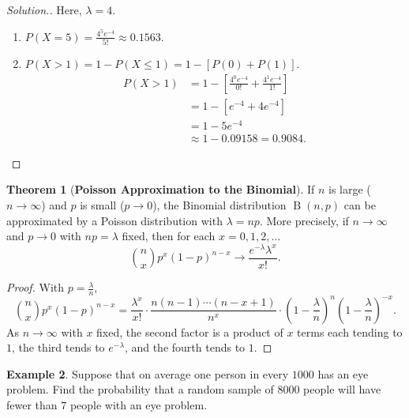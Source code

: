 \documentclass[12pt,a4paper]{report}
\theoremstyle{definition}
\newtheorem{thm}{Theorem}[section]
\newtheorem{example}[thm]{Example}
\theoremstyle{plain}
\theoremstyle{definition}
\newenvironment{solution}
  {\renewcommand{\qedsymbol}{}\begin{proof}[\textit{Solution}.]}
  {\end{proof}}
\begin{document}
\begin{solution}
Here, $\lambda = 4$.
\begin{enumerate}
\item[(i)] $P(X=5) = \frac{4^5 e^{-4}}{5!} \approx 0.1563$.
\item[(ii)] $P(X > 1) = 1 - P(X \leq 1) = 1 - [P(0) + P(1)]$.
\begin{align*}
P(X > 1) &= 1 - \left[ \frac{4^0 e^{-4}}{0!} + \frac{4^1 e^{-4}}{1!} \right]\\
&= 1 - [e^{-4} + 4e^{-4}]\\
& = 1 - 5e^{-4} \\
& \approx 1 - 0.09158 = 0.9084.
\end{align*}
\end{enumerate}
\end{solution}







\begin{thm}[\textbf{Poisson Approximation to the Binomial}]
If $n$ is large ($n \to \infty$) and $p$ is small ($p \to 0$), the Binomial distribution $\operatorname{B}(n, p)$ can be approximated by a Poisson distribution with $\lambda = np$.
More precisely, if $n\to\infty$ and $p\to 0$ with $np = \lambda$ fixed, then for each $x = 0, 1, 2, \dots$
\[\binom nx p^x(1 - p)^{n - x}\longrightarrow\frac{e^{-\lambda}\lambda^x}{x!} .\]
\end{thm}

\begin{proof}
With $p = \frac\lambda n$,
\[\binom nx p^x(1 - p)^{n - x} = \frac{\lambda^x}{x!}\cdot\frac{n(n - 1)\cdots(n - x + 1)}{n^x}\cdot\left(1 - \frac\lambda n\right)^n\left(1 - \frac\lambda n\right)^{-x} .\]
As $n\to\infty$ with $x$ fixed, the second factor is a product of $x$ terms each tending to $1$,
the third tends to $e^{-\lambda}$, and the fourth tends to $1$.
\end{proof}




\begin{example}
Suppose that on average one person in every $1000$ has an eye problem. Find the probability that a random sample of $8000$ people will have fewer than $7$ people with an eye problem.
\end{example}
\end{document}
